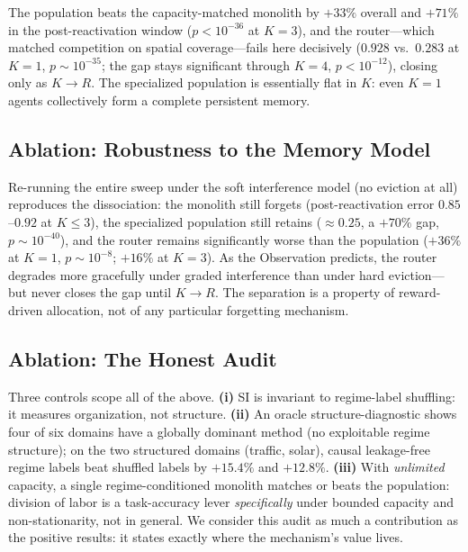 \documentclass[11pt]{article}
\begin{document}
The population beats the capacity-matched monolith by $+33\%$ overall and
$+71\%$ in the post-reactivation window ($p<10^{-36}$ at $K{=}3$), and the
router---which matched competition on spatial coverage---fails here decisively
($0.928$ vs.\ $0.283$ at $K{=}1$, $p\sim10^{-35}$; the gap stays significant
through $K{=}4$, $p<10^{-12}$), closing only as $K \to R$. The specialized
population is essentially flat in $K$: even $K{=}1$ agents collectively form a
complete persistent memory.

\subsection{Ablation: Robustness to the Memory Model}

Re-running the entire sweep under the soft interference model (no eviction at
all) reproduces the dissociation: the monolith still forgets (post-reactivation
error $0.85$--$0.92$ at $K \le 3$), the specialized population still retains
($\approx 0.25$, a $+70\%$ gap, $p\sim10^{-40}$), and the router remains
significantly worse than the population ($+36\%$ at $K{=}1$, $p\sim10^{-8}$;
$+16\%$ at $K{=}3$). As the Observation predicts, the router degrades more
gracefully under graded interference than under hard eviction---but never closes
the gap until $K \to R$. The separation is a property of reward-driven
allocation, not of any particular forgetting mechanism.

\subsection{Ablation: The Honest Audit}

Three controls scope all of the above. \textbf{(i)} SI is invariant to
regime-label shuffling: it measures organization, not structure. \textbf{(ii)}
An oracle structure-diagnostic shows four of six domains have a globally
dominant method (no exploitable regime structure); on the two structured domains
(traffic, solar), causal leakage-free regime labels beat shuffled labels by
$+15.4\%$ and $+12.8\%$. \textbf{(iii)} With \emph{unlimited} capacity, a single
regime-conditioned monolith matches or beats the population: division of labor
is a task-accuracy lever \emph{specifically} under bounded capacity and
non-stationarity, not in general. We consider this audit as much a contribution
as the positive results: it states exactly where the mechanism's value lives.

\end{document}
